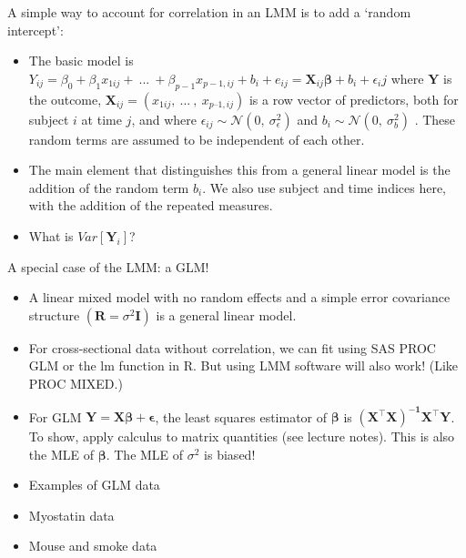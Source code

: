 \documentclass[
  9pt,
  ignorenonframetext,
]{beamer}
\begin{document}
\begin{frame}{A simple way to account for correlation in an LMM is to
add a `random intercept':}
\protect\hypertarget{a-simple-way-to-account-for-correlation-in-an-lmm-is-to-add-a-random-intercept}{}
\begin{itemize}
\item
  The basic model is
  \(Y_{ij} = \beta_0 + \beta_1 x_{1ij} +\ ...\ + \beta_{p-1} x_{p-1, ij} + b_i + e_{ij} = \pmb X_{ij} \pmb \beta + b_i +\epsilon_ij\)
  where \(\pmb Y\) is the outcome,
  \(\pmb X_{ij} = (x_{1ij},\ ...\ ,\ x_{p–1,ij})\) is a row vector of
  predictors, both for subject \(i\) at time \(j\), and where
  \(\epsilon_{ij} \sim \mathcal N (0,\ \sigma_\epsilon^2)\) and
  \(b_{i} \sim \mathcal N (0,\ \sigma_b^2)\) . These random terms are
  assumed to be independent of each other.
\item
  The main element that distinguishes this from a general linear model
  is the addition of the random term \(b_i\). We also use subject and
  time indices here, with the addition of the repeated measures.
\item
  What is \(Var[\pmb Y_i]\)?
\end{itemize}
\end{frame}

\begin{frame}{A special case of the LMM: a GLM!}
\protect\hypertarget{a-special-case-of-the-lmm-a-glm}{}
\begin{itemize}
\item
  A linear mixed model with no random effects and a simple error
  covariance structure \((\pmb R=\sigma ^2 \pmb I)\) is a general linear
  model.
\item
  For cross-sectional data without correlation, we can fit using SAS
  PROC GLM or the lm function in R. But using LMM software will also
  work! (Like PROC MIXED.)
\item
  For GLM \(\pmb Y= \pmb X \pmb \beta + \pmb \epsilon\), the least
  squares estimator of \(\pmb \beta\) is
  \(\pmb {(X^{\top}X)^{-1}X^{\top}Y}\). To show, apply calculus to
  matrix quantities (see lecture notes). This is also the MLE of
  \(\pmb \beta\). The MLE of \(\sigma^2\) is biased!
\item
  Examples of GLM data
\item
  Myostatin data
\item
  Mouse and smoke data
\end{itemize}
\end{frame}
\end{document}
